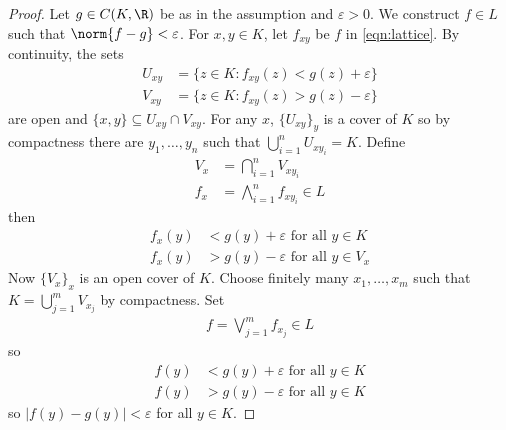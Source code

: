 \documentclass[a4paper]{article}
\begin{document}
\begin{proof}
  Let \(g \in C(K, \R)\) be as in the assumption and \(\varepsilon > 0\). We construct \(f \in L\) such that \(\norm{f - g} < \varepsilon\). For \(x, y \in K\), let \(f_{xy}\) be \(f\) in \eqref{eqn:lattice}. By continuity, the sets
  \begin{align*}
    U_{xy} &= \{z \in K: f_{xy}(z) < g(z) + \varepsilon\} \\
    V_{xy} &= \{z \in K: f_{xy}(z) > g(z) - \varepsilon\}
  \end{align*}
  are open and \(\{x, y\} \subseteq U_{xy} \cap V_{xy}\). For any \(x\), \(\{U_{xy}\}_y\) is a cover of \(K\) so by compactness there are \(y_1, \dots, y_n\) such that \(\bigcup_{i = 1}^n U_{xy_i} = K\). Define
  \begin{align*}
    V_x &= \bigcap_{i = 1}^n V_{xy_i} \\
    f_x &= \bigwedge_{i = 1}^n f_{xy_i} \in L
  \end{align*}
  then
  \begin{align*}
    f_x(y) &< g(y) + \varepsilon \text{ for all } y \in K \\
    f_x(y) &> g(y) - \varepsilon \text{ for all } y \in V_x
  \end{align*}
  Now \(\{V_x\}_x\) is an open cover of \(K\). Choose finitely many \(x_1, \dots, x_m\) such that \(K = \bigcup_{j = 1}^m V_{x_j}\) by compactness. Set
  \begin{align*}
    f = \bigvee_{j = 1}^m f_{x_j} \in L
  \end{align*}
  so
  \begin{align*}
    f(y) &< g(y) + \varepsilon \text{ for all } y \in K \\
    f(y) &> g(y) - \varepsilon \text{ for all } y \in K
  \end{align*}
  so \(|f(y) - g(y)| < \varepsilon\) for all \(y \in K\).
\end{proof}
\end{document}

